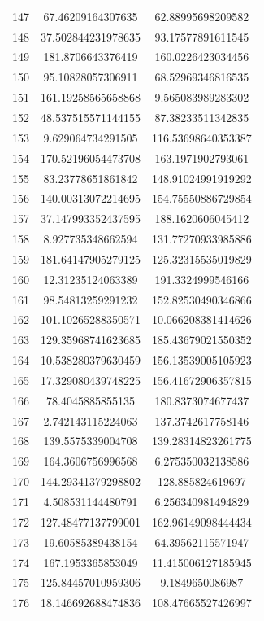 \documentclass[a4paper,12pt,twoside,openany]{report}
\begin{document}
\begin{longtable}{*{3}{c}}
147	& 67.46209164307635	& 62.88995698209582	\\
148	& 37.502844231978635	& 93.17577891611545	\\
149	& 181.8706643376419	& 160.0226423034456	\\
150	& 95.10828057306911	& 68.52969346816535	\\
151	& 161.19258565658868	& 9.565083989283302	\\
152	& 48.537515571144155	& 87.38233511342835	\\
153	& 9.629064734291505	& 116.53698640353387	\\
154	& 170.52196054473708	& 163.1971902793061	\\
155	& 83.23778651861842	& 148.91024991919292	\\
156	& 140.00313072214695	& 154.75550886729854	\\
157	& 37.147993352437595	& 188.1620606045412	\\
158	& 8.927735348662594	& 131.77270933985886	\\
159	& 181.64147905279125	& 125.32315535019829	\\
160	& 12.31235124063389	& 191.3324999546166	\\
161	& 98.54813259291232	& 152.82530490346866	\\
162	& 101.10265288350571	& 10.066208381414626	\\
163	& 129.35968741623685	& 185.43679021550352	\\
164	& 10.538280379630459	& 156.13539005105923	\\
165	& 17.329080439748225	& 156.41672906357815	\\
166	& 78.4045885855135	& 180.8373074677437	\\
167	& 2.742143115224063	& 137.3742617758146	\\
168	& 139.5575339004708	& 139.28314823261775	\\
169	& 164.3606756996568	& 6.275350032138586	\\
170	& 144.29341379298802	& 128.885824619697	\\
171	& 4.508531144480791	& 6.256340981494829	\\
172	& 127.48477137799001	& 162.96149098444434	\\
173	& 19.60585389438154	& 64.39562115571947	\\
174	& 167.1953365853049	& 11.415006127185945	\\
175	& 125.84457010959306	& 9.1849650086987	\\
176	& 18.146692688474836	& 108.47665527426997	\\

\end{longtable}
\end{document}

